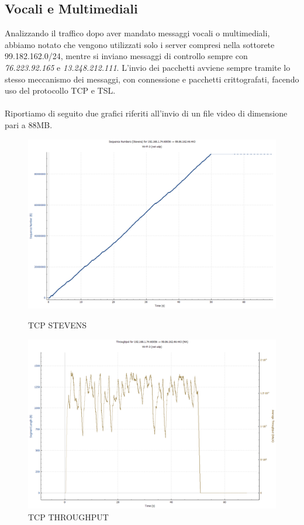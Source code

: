 \documentclass{article}
\begin{document}
\subsection{Vocali e Multimediali}
Analizzando il traffico dopo aver mandato messaggi vocali o multimediali, abbiamo notato che vengono utilizzati solo i server compresi nella sottorete
99.182.162.0/24, mentre si inviano messaggi di controllo sempre con \textit{76.223.92.165 } e \textit{13.248.212.111}. 
L'invio dei pacchetti avviene sempre tramite lo stesso meccanismo dei messaggi, con connessione e pacchetti crittografati, facendo uso del protocollo
TCP e TSL.\\\\
Riportiamo di seguito due grafici riferiti all'invio di un file video di dimensione pari a 88MB.
\vspace{10pt}
\begin{figure}[!htb]
  \begin{minipage}{0.48\textwidth}
      \centering
      \includegraphics[width=1\linewidth]{filestevens.png}
      \vspace{-20pt}
      \caption{TCP STEVENS}\label{STEVENS}
  \end{minipage}\hfill
    \begin{minipage}{0.48\textwidth}
        \centering
        \includegraphics[width=1\linewidth]{filethr.png}
        \vspace{-20pt}
        \caption{TCP THROUGHPUT}\label{THROUGHPUT}
    \end{minipage}\hfill
  \end{figure}
\end{document}
